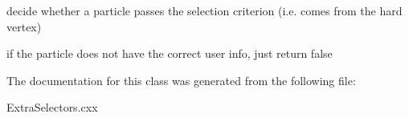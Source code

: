 decide whether a particle passes the selection criterion (i.e. comes from the hard vertex)

if the particle does not have the correct user info, just return false 

The documentation for this class was generated from the following file:\begin{CompactItemize}
\item 
Extra\-Selectors.cxx\end{CompactItemize}
